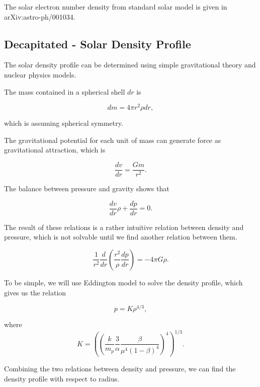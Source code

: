 \documentclass{tufte-handout}
\begin{document}
The solar electron number density from standard solar model is given in arXiv:astro-ph/001034.

















\subsection{Decapitated - Solar Density Profile}



The solar density profile can be determined using simple gravitational theory and nuclear physics models.

The mass contained in a spherical shell $dr$ is

\begin{equation}
    dm = 4\pi r^2 \rho dr ,
\end{equation}

which is assuming spherical symmetry.

The gravitational potential for each unit of mass can generate force as gravitational attraction, which is

\begin{equation*}
    \frac{dv}{dr} = \frac{G m}{r^2}.
\end{equation*}

The balance between pressure and gravity shows that

\begin{equation*}
    \frac{dv}{dr} \rho + \frac{dp}{dr} = 0.
\end{equation*}

The result of these relations is a rather intuitive relation between density and pressure, which is not solvable until we find another relation between them.

\begin{equation*}
    \frac{1}{r^2} \frac{d}{dr} \left( \frac{r^2}{\rho} \frac{dp}{dr} \right) = -4\pi G\rho.
\end{equation*}

To be simple, we will use Eddington model to solve the density profile, which gives us the relation

\begin{equation*}
    p = K \rho^{4/3},
\end{equation*}


where 
\begin{equation*}
    K = \left(  \left( \frac{k}{m_p} \frac{3}{\alpha} \frac{\beta}{\mu^4(1-\beta)^4}  \right)^4  \right)^{1/3}.
\end{equation*}

Combining the two relations between density and pressure, we can find the density profile with respect to radius.
\end{document}
